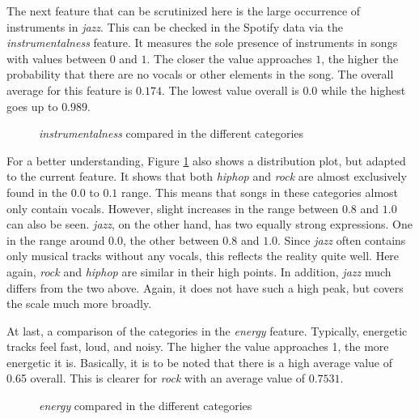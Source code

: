 The next feature that can be scrutinized here is the large occurrence of instruments in \emph{jazz}.
This can be checked in the Spotify data via the \emph{instrumentalness} feature.
It measures the sole presence of instruments in songs with values between \(0\) and \(1\).
The closer the value approaches \(1\), the higher the probability that there are no vocals or other
elements in the song. The overall average for this feature is \(0.174\).
The lowest value overall is \(0.0\) while the highest goes up to \(0.989\).

\begin{figure}[H]
    \centering
    \qquad
    \caption{\emph{instrumentalness} compared in the different categories}%
    \label{fig:du_dp_bp_instr_categorie_dependent}%
\end{figure}

For a better understanding, Figure \ref{fig:du_dp_bp_instr_categorie_dependent}  also shows a distribution plot,
but adapted to the current feature.
It shows that both \emph{\emph{hiphop}} and \emph{rock} are almost exclusively found in the \(0.0\) to \(0.1\) range.
This means that songs in these categories almost only contain vocals.
However, slight increases in the range between \(0.8\) and \(1.0\) can also be seen. \emph{jazz},
on the other hand, has two equally strong expressions. One in the range around \(0.0\),
the other between \(0.8\) and \(1.0\). Since \emph{jazz} often contains only musical tracks without
any vocals, this reflects the reality quite well.
Here again, \emph{rock} and \emph{\emph{hiphop}} are similar in their high points.
In addition, \emph{jazz} much differs from the two above. Again, it does not have such a high peak, 
but covers the scale much more broadly.

At last, a comparison of the categories in the \emph{energy} feature.
Typically, energetic tracks feel fast, loud, and noisy.
The higher the value approaches 1, the more energetic it is.
Basically, it is to be noted that there is a high average value of 0.65 overall.
This is clearer for \emph{rock} with an average value of \(0.7531\).

\begin{figure}[H]
    \centering
    \qquad
    \caption{\emph{energy} compared in the different categories}%
    \label{fig:du_dp_bp_enrg_categorie_dependent}%
\end{figure}

